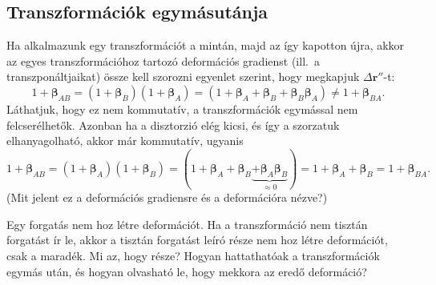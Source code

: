 \documentclass[12pt,a4paper]{scrartcl}
\let\mathbf\bm
\begin{document}
\subsection{Transzformációk egymásutánja}
Ha alkalmazunk egy transzformációt a mintán, majd az így kapotton újra, akkor az egyes transzformációhoz tartozó deformációs gradienst (ill.\ a transzponáltjaikat) össze kell szorozni \az{\eqref{eq:disztrozio_def}} egyenlet szerint, hogy megkapjuk $\Delta {\mathbf{r}}''$-t:
\[1 + {{\mathbf{\beta }}_{AB}} = \left( {1 + {{\mathbf{\beta }}_B}} \right)\left( {1 + {{\mathbf{\beta }}_A}} \right) = \left( {1 + {{\mathbf{\beta }}_A} + {{\mathbf{\beta }}_B} + {{\mathbf{\beta }}_B}{{\mathbf{\beta }}_A}} \right) \ne 1 + {{\mathbf{\beta }}_{BA}}.\]
Láthatjuk, hogy ez nem kommutatív, a transzformációk egymással nem felcserélhetők. Azonban ha a disztorzió elég kicsi, és így a szorzatuk elhanyagolható, akkor már kommutatív, ugyanis 
\begin{equation} \label{eq:deform_kommutatív}
1 + {{\mathbf{\beta }}_{AB}} = \left( {1 + {{\mathbf{\beta }}_A}} \right)\left( {1 + {{\mathbf{\beta }}_B}} \right) = \left( {1 + {{\mathbf{\beta }}_A} + {{\mathbf{\beta }}_B}\underbrace { + {{\mathbf{\beta }}_A}{{\mathbf{\beta }}_B}}_{ \approx 0}} \right) = 1 + {{\mathbf{\beta }}_A} + {{\mathbf{\beta }}_B} = 1 + {{\mathbf{\beta }}_{BA}}.
\end{equation}
(Mit jelent ez a deformációs gradiensre és a deformációra nézve?)

Egy forgatás nem hoz létre deformációt. Ha a transzformáció nem tisztán forgatást ír le, akkor a tisztán forgatást leíró része nem hoz létre deformációt, csak a maradék. Mi az, hogy része? Hogyan hattathatóak a transzformációk egymás után, és hogyan olvasható le, hogy mekkora az eredő deformáció?
\end{document}
